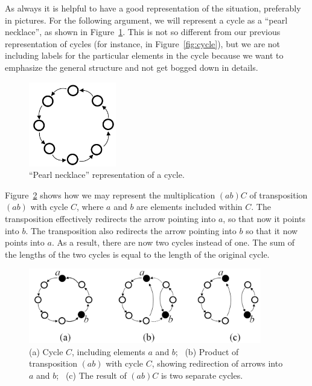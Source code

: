 As always it is helpful to have a good representation of the situation, preferably in pictures. For the following argument, we will represent a cycle as a ``pearl necklace'', as shown in Figure~\ref{fig:pearl}. This is not so different from our previous representation of cycles (for instance, in Figure~\ref{fig:cycle}), but we are not including labels for the particular elements in the cycle because we want to emphasize the general structure and not get bogged down in details. 

\begin{figure}[ht]
\begin{center}
\includegraphics[width=1.5in]{images/pearl_necklace.png}
\caption{``Pearl necklace'' representation of a cycle.}\label{fig:pearl}
\end{center}
\end{figure}


Figure~\ref{fig:abC} shows how we may represent the multiplication $(ab)C$ of transposition $(ab)$ with cycle $C$, where $a$ and $b$ are elements included within $C$. The transposition effectively redirects the arrow pointing into $a$, so that now it points into $b$. The transposition also redirects the arrow pointing into $b$ so that it now points into $a$. As a result, there are now two cycles instead of one. The sum of the lengths of the two cycles is equal to the length of the original cycle.

\begin{figure}[ht]
\begin{center}
\includegraphics[width=4in]{images/abC.png}
\caption{(a) Cycle $C$, including elements $a$ and $b$;~ (b) Product of transposition $(ab)$ with cycle $C$, showing redirection of arrows into $a$ and $b$;~ (c) The result of $(ab)C$ is two separate cycles.}\label{fig:abC}
\end{center}
\end{figure}

